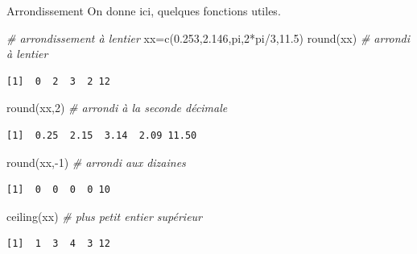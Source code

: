 \documentclass[
  8pt,
  ignorenonframetext,
]{beamer}
\newenvironment{Shaded}{\begin{snugshade}}{\end{snugshade}}
\newcommand{\CommentTok}[1]{\textcolor[rgb]{0.56,0.35,0.01}{\textit{#1}}}
\newcommand{\DecValTok}[1]{\textcolor[rgb]{0.00,0.00,0.81}{#1}}
\newcommand{\FloatTok}[1]{\textcolor[rgb]{0.00,0.00,0.81}{#1}}
\newcommand{\FunctionTok}[1]{\textcolor[rgb]{0.00,0.00,0.00}{#1}}
\newcommand{\NormalTok}[1]{#1}
\newcommand{\OtherTok}[1]{\textcolor[rgb]{0.56,0.35,0.01}{#1}}
\newcommand{\SpecialCharTok}[1]{\textcolor[rgb]{0.00,0.00,0.00}{#1}}
\begin{document}
\begin{frame}[fragile]{Arrondissement}
\protect\hypertarget{arrondissement}{}
On donne ici, quelques fonctions utiles.

\begin{Shaded}
\begin{Highlighting}[]
\CommentTok{\# arrondissement à l\textquotesingle{}entier}
\NormalTok{xx}\OtherTok{=}\FunctionTok{c}\NormalTok{(}\FloatTok{0.253}\NormalTok{,}\FloatTok{2.146}\NormalTok{,pi,}\DecValTok{2}\SpecialCharTok{*}\NormalTok{pi}\SpecialCharTok{/}\DecValTok{3}\NormalTok{,}\FloatTok{11.5}\NormalTok{)}
\FunctionTok{round}\NormalTok{(xx)     }\CommentTok{\# arrondi à l\textquotesingle{}entier}
\end{Highlighting}
\end{Shaded}

\begin{verbatim}
[1]  0  2  3  2 12
\end{verbatim}

\begin{Shaded}
\begin{Highlighting}[]
\FunctionTok{round}\NormalTok{(xx,}\DecValTok{2}\NormalTok{)   }\CommentTok{\# arrondi à la seconde décimale}
\end{Highlighting}
\end{Shaded}

\begin{verbatim}
[1]  0.25  2.15  3.14  2.09 11.50
\end{verbatim}

\begin{Shaded}
\begin{Highlighting}[]
\FunctionTok{round}\NormalTok{(xx,}\SpecialCharTok{{-}}\DecValTok{1}\NormalTok{)  }\CommentTok{\# arrondi aux dizaines}
\end{Highlighting}
\end{Shaded}

\begin{verbatim}
[1]  0  0  0  0 10
\end{verbatim}

\begin{Shaded}
\begin{Highlighting}[]
\FunctionTok{ceiling}\NormalTok{(xx)   }\CommentTok{\# plus petit entier supérieur}
\end{Highlighting}
\end{Shaded}

\begin{verbatim}
[1]  1  3  4  3 12
\end{verbatim}


\end{frame}
\end{document}
